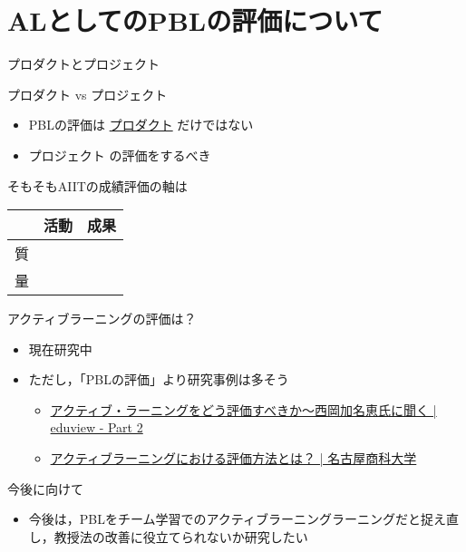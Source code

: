 \documentclass[uplatex,dvipdfmx,14pt,presentation,t]{beamer}
\begin{document}
\section{ALとしてのPBLの評価について}
\label{sec-3}
\begin{frame}[label=sec-3-1]{プロダクトとプロジェクト}
\begin{block}{プロダクト vs プロジェクト}
\begin{itemize}
\item PBLの評価は \uline{プロダクト} だけではない
\item \alert{プロジェクト} の評価をするべき
\end{itemize}
\pause
\end{block}
\begin{block}{そもそもAIITの成績評価の軸は}
\begin{center}
\begin{tabular}{lll}
 & 活動 & 成果\\
\hline
質 &  & \\
量 &  & \\
\end{tabular}
\end{center}
\end{block}
\end{frame}
\begin{frame}[label=sec-3-2]{アクティブラーニングの評価は？}
\begin{itemize}
\item 現在研究中
\item ただし，「PBLの評価」より研究事例は多そう
\begin{itemize}
\item \href{http://eduview.jp/?p=1636&page=2}{アクティブ・ラーニングをどう評価すべきか〜西岡加名恵氏に聞く | eduview - Part 2}
\item \href{http://www.nucba.ac.jp/active-learning/entry-15216.html}{アクティブラーニングにおける評価方法とは？ | 名古屋商科大学}
\end{itemize}
\end{itemize}
\end{frame}

\begin{frame}[label=sec-3-3]{今後に向けて}
\begin{itemize}
\item 今後は，PBLをチーム学習でのアクティブラーニングラーニングだと捉え直し，教授法の改善に役立てられないか研究したい
\end{itemize}
\end{frame}
\end{document}
